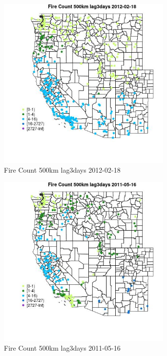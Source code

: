 \begin{figure} 
\centering  
\includegraphics[width=0.77\textwidth]{Code_Outputs/Report_ML_input_PM25_Step4_part_f_de_duplicated_aveswNAs_MapObsFire_Count_500km_lag3days2012-02-18.jpg} 
\caption{\label{fig:Report_ML_input_PM25_Step4_part_f_de_duplicated_aveswNAsMapObsFire_Count_500km_lag3days2012-02-18}Fire Count 500km lag3days 2012-02-18} 
\end{figure} 
 

\clearpage 

\begin{figure} 
\centering  
\includegraphics[width=0.77\textwidth]{Code_Outputs/Report_ML_input_PM25_Step4_part_f_de_duplicated_aveswNAs_MapObsFire_Count_500km_lag3days2011-05-16.jpg} 
\caption{\label{fig:Report_ML_input_PM25_Step4_part_f_de_duplicated_aveswNAsMapObsFire_Count_500km_lag3days2011-05-16}Fire Count 500km lag3days 2011-05-16} 
\end{figure} 
 

